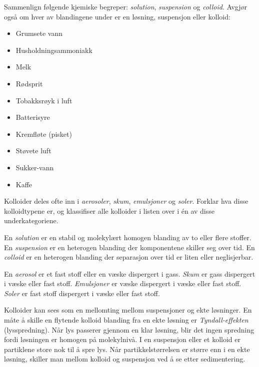 

Sammenlign følgende kjemiske begreper: {\it solution}, {\it suspension} og {\it colloid}. Avgjør også om hver av blandingene under er en løsning, suspensjon eller kolloid:

\begin{itemize}
\item{} Grumsete vann
\item{} Husholdningsammoniakk
\item{} Melk
\item{} Rødsprit
\item{} Tobakksrøyk i luft
\item{} Batterisyre
\item{} Kremfløte (pisket)
\item{} Støvete luft
\item{} Sukker-vann
\item{} Kaffe
\end{itemize} 

Kolloider deles ofte inn i {\it aerosoler}, {\it skum}, {\it emulsjoner} og {\it soler}. Forklar hva disse kolloidtypene er, og klassifiser alle kolloider i listen over i én av disse underkategoriene.







En {\it solution} er en stabil og molekylært homogen blanding av to eller flere stoffer. En {\it suspension} er en heterogen blanding der komponentene skiller seg over tid. En {\it colloid} er en heterogen blanding der separasjon over tid er liten eller neglisjerbar.

\vskip 10pt

En {\it aerosol} er et fast stoff eller en væske dispergert i gass. {\it Skum} er gass dispergert i væske eller fast stoff. {\it Emulsjoner} er væske dispergert i væske eller fast stoff. {\it Soler} er fast stoff dispergert i væske eller fast stoff.

\vskip 10pt

Kolloider kan sees som en mellomting mellom suspensjoner og ekte løsninger. En måte å skille en flytende kolloid blanding fra en ekte løsning er {\it Tyndall-effekten} (lysspredning). Når lys passerer gjennom en klar løsning, blir det ingen spredning fordi løsningen er homogen på molekylnivå. I en suspensjon eller et kolloid er partiklene store nok til å spre lys. Når partikkelstørrelsen er større enn i en ekte løsning, skiller man mellom kolloid og suspensjon ved å se etter sedimentering.

